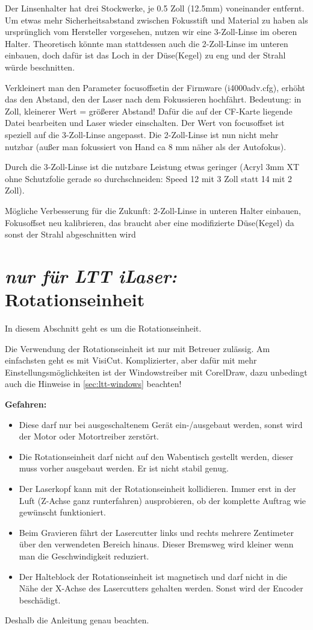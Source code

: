 \documentclass{\basedir/fablab-document}
\newcommand{\nurLTT}{\emph{nur für LTT iLaser:} }
\begin{document}
	Der Linsenhalter hat drei \glqq Stockwerke\grqq, je 0.5 Zoll (12.5mm) voneinander entfernt. Um etwas mehr Sicherheitsabstand zwischen Fokusstift und Material zu haben als ursprünglich vom Hersteller vorgesehen, nutzen wir eine 3-Zoll-Linse im oberen Halter. Theoretisch könnte man stattdessen auch die 2-Zoll-Linse im unteren einbauen, doch dafür ist das Loch in der \glqq Düse\grqq (Kegel) zu eng und der Strahl würde beschnitten.

	Verkleinert man den Parameter \glqq focusoffset\grqq in der Firmware (i4000adv.cfg), erhöht das den Abstand, den der Laser nach dem Fokussieren hochfährt. Bedeutung: in Zoll, kleinerer Wert = größerer Abstand! Dafür die auf der CF-Karte liegende Datei bearbeiten und Laser wieder einschalten. Der Wert von focusoffset ist speziell auf die 3-Zoll-Linse angepasst. Die 2-Zoll-Linse ist nun nicht mehr nutzbar (außer man fokussiert von Hand ca 8 mm näher als der Autofokus).

	Durch die 3-Zoll-Linse ist die nutzbare Leistung etwas geringer (Acryl 3mm XT ohne Schutzfolie gerade so durchschneiden: Speed 12 mit 3 Zoll statt 14 mit 2 Zoll).

	Mögliche Verbesserung für die Zukunft: 2-Zoll-Linse in unteren Halter einbauen, Fokusoffset neu kalibrieren, das braucht aber eine modifizierte \glqq Düse\grqq (Kegel) da sonst der Strahl abgeschnitten wird



	\section{\nurLTT Rotationseinheit}
	In diesem Abschnitt geht es um die Rotationseinheit.

	 Die Verwendung der Rotationseinheit ist nur mit Betreuer zulässig.
	 Am einfachsten geht es mit VisiCut. Komplizierter, aber dafür mit mehr Einstellungsmöglichkeiten ist der Windowstreiber mit CorelDraw, dazu unbedingt auch die Hinweise in \cref{sec:ltt-windows} beachten!

	\textbf{Gefahren:}
	\begin{itemize}
		\item Diese darf nur bei ausgeschaltenem Gerät ein-/ausgebaut werden, sonst wird der Motor oder Motortreiber zerstört.
		\item Die Rotationseinheit darf nicht auf den Wabentisch gestellt werden, dieser muss vorher ausgebaut werden. Er ist nicht stabil genug.
		\item Der Laserkopf kann mit der Rotationseinheit kollidieren. Immer erst in der Luft (Z-Achse ganz runterfahren) ausprobieren, ob der komplette Auftrag wie gewünscht funktioniert.
		\item Beim Gravieren fährt der Lasercutter links und rechts mehrere Zentimeter über den verwendeten Bereich hinaus. Dieser Bremsweg wird kleiner wenn man die Geschwindigkeit reduziert.
		\item Der Halteblock der Rotationseinheit ist magnetisch und darf nicht in die Nähe der X-Achse des Lasercutters gehalten werden. Sonst wird der Encoder beschädigt.
	\end{itemize}
	Deshalb die Anleitung genau beachten.
\end{document}
